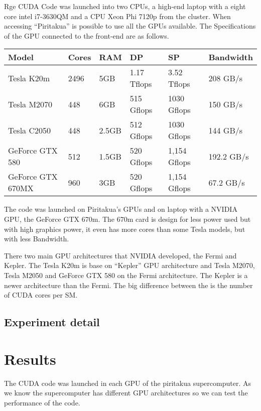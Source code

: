  Rge CUDA Code was launched into two CPUs, a high-end laptop with a eight core intel i7-3630QM and a CPU Xeon Phi 7120p from the cluster. 
 When accessing ``Piritakua'' is possible to use all the GPUs available. The Specifications of the GPU connected to the front-end are as follows.
  
  \begin{tabular}{ |  l  |  l  |  l  |  l  |  l  | l | }      
    \hline
    Model & Cores & RAM & DP & SP & Bandwidth \\
    \hline
    Tesla K20m & 2496 & 5GB & 1.17 Tflops & 3.52 Tflops & 208 GB/s \\
   \hline
    Tesla M2070 & 448 & 6GB & 515 Gflops & 1030 Gflops & 150 GB/s \\
   \hline
     Tesla C2050 & 448 & 2.5GB & 512 Gflops & 1030 Gflops & 144 GB/s \\
   \hline
      GeForce GTX 580 & 512 & 1.5GB & 520 Gflops & 1,154 Gflops & 192.2 GB/s \\
   \hline
   GeForce GTX 670MX & 960 & 3GB & 520 Gflops & 1,154 Gflops & 67.2 GB/s \\
   \hline
  \end{tabular}
  
   The code was launched on Piritakua's GPUs and on laptop with a NVIDIA GPU, the GeForce GTX 670m. The 670m card is design for less power used but with high graphics power, it even has more cores than some Tesla models, but with less Bandwidth.
  
There two main GPU architectures that NVIDIA developed, the Fermi and Kepler. The Tesla K20m is base on ``Kepler'' GPU architecture and Tesla M2070, Tesla M2050 and GeForce GTX 580 on the Fermi architecture. The Kepler is a newer architecture than the Fermi. The big difference between the is the number of CUDA cores per SM.
  
  
 \subsection{Experiment detail}  

\section{Results}

The CUDA code was launched in each GPU of the piritakua supercomputer. As we know the supercomputer has different GPU architectures so we can test the performance of the code.



